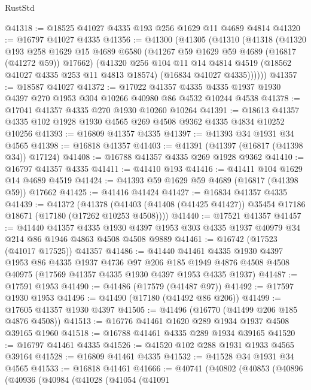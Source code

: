 \begin{lexlean}{RustStd}
\begin{coremodule}
@41318 := @18525 @41027 @4335 @193 @256 @1629 @11 @4689 @4814
@41320 := @16797 @41027 @4335
@41356 := @41300
    (@41305
      (@41310
        (@41318
          (@41320
            @193
            @258
            @1629
            @15
            @4689
            @6580
            (@41267 @59 @1629 @59 @4689 (@16817 (@41272 @59)) @17662)
            (@41320
              @256
              @104
              @11
              @14
              @4814
              @4519
              (@18562 @41027 @4335 @253 @11 @4813 @18574)
              (@16834 @41027 @4335))))))
@41357 := @18587 @41027
@41372 := @17022
    @41357
    @4335
    @4335
    @1937
    @1930
    @4397
    @270
    @1953
    @304
    @10266
    @40980
    @86
    @4532
    @10244
    @4538
@41378 := @17041 @41357 @4335 @270 @1930 @10260 @10264
@41391 := @18613 @41357 @4335 @102 @1928 @1930 @4565 @269 @4508 @9362 @4335 @4834 @10252 @10256
@41393 := @16809 @41357 @4335
@41397 := @41393 @34 @1931 @34 @4565
@41398 := @16818 @41357
@41403 := @41391 (@41397 (@16817 (@41398 @34)) @17124)
@41408 := @16788 @41357 @4335 @269 @1928 @9362
@41410 := @16797 @41357 @4335
@41411 := @41410 @193
@41416 := @41411 @104 @1629 @14 @4689 @4519
@41424 := @41393 @59 @1629 @59 @4689 (@16817 (@41398 @59)) @17662
@41425 := @41416 @41424
@41427 := @16834 @41357 @4335
@41439 := @41372
    (@41378 (@41403 (@41408 (@41425 @41427)) @35454 @17186 @18671 (@17180 (@17262 @10253 @4508))))
@41440 := @17521 @41357
@41457 := @41440
    @41357
    @4335
    @1930
    @4397
    @1953
    @303
    @4335
    @1937
    @40979
    @34
    @214
    @86
    @1946
    @4863
    @4508
    @4508
    @9889
@41461 := @16742 (@17523 (@41017 @17525)) @41357
@41486 := @41440
    @41461
    @4335
    @1930
    @4397
    @1953
    @86
    @4335
    @1937
    @4736
    @97
    @206
    @185
    @1949
    @4876
    @4508
    @4508
    @40975
    (@17569 @41357 @4335 @1930 @4397 @1953 @4335 @1937)
@41487 := @17591 @1953
@41490 := @41486 (@17579 (@41487 @97))
@41492 := @17597 @1930 @1953
@41496 := @41490 (@17180 (@41492 @86 @206))
@41499 := @17605 @41357 @1930 @4397
@41505 := @41496 (@16770 (@41499 @206 @185 @4876 @4508))
@41513 := @16776 @41461 @1620 @289 @1934 @1937 @4508 @39165 @1960
@41518 := @16788 @41461 @4335 @289 @1934 @39165
@41520 := @16797 @41461 @4335
@41526 := @41520 @102 @288 @1931 @1933 @4565 @39164
@41528 := @16809 @41461 @4335
@41532 := @41528 @34 @1931 @34 @4565
@41533 := @16818 @41461
@41666 := @40741
    (@40802
      (@40853
        (@40896
          (@40936
            (@40984
              (@41028
                (@41054
                  (@41091

\end{coremodule}
\end{lexlean}
